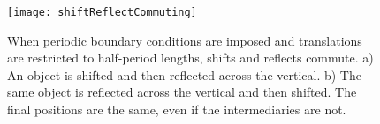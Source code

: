 \begin{figure}[t!]
\texttt{[image: shiftReflectCommuting]}
\caption{When periodic boundary conditions are imposed and translations are restricted to half-period lengths, shifts and reflects commute. a) An object is shifted and then reflected across the vertical. b) The same object is reflected across the vertical and then shifted. The final positions are the same, even if the intermediaries are not.}\label{fig:abelian}
\end{figure}
  
